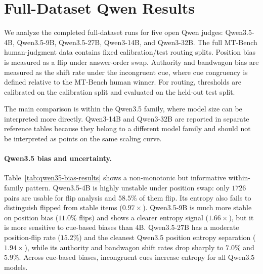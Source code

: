 \section{Full-Dataset Qwen Results}
\label{sec:full-qwen-results}

We analyze the completed full-dataset runs for five open Qwen judges:
Qwen3.5-4B, Qwen3.5-9B, Qwen3.5-27B, Qwen3-14B, and Qwen3-32B. The full
MT-Bench human-judgment data contains fixed calibration/test routing splits.
Position bias is measured as a flip under answer-order swap. Authority and
bandwagon bias are measured as the shift rate under the incongruent cue, where
cue congruency is defined relative to the MT-Bench human winner. For routing,
thresholds are calibrated on the calibration split and evaluated on the
held-out test split.

The main comparison is within the Qwen3.5 family, where model size can be
interpreted more directly. Qwen3-14B and Qwen3-32B are reported in separate
reference tables because they belong to a different model family and should not
be interpreted as points on the same scaling curve.

\paragraph{Qwen3.5 bias and uncertainty.}
Table~\ref{tab:qwen35-bias-results} shows a non-monotonic but informative
within-family pattern. Qwen3.5-4B is highly unstable under position swap:
only $1726$ pairs are usable for flip analysis and $58.5\%$ of them flip. Its
entropy also fails to distinguish flipped from stable items ($0.97\times$).
Qwen3.5-9B is much more stable on position bias ($11.0\%$ flips) and shows a
clearer entropy signal ($1.66\times$), but it is more sensitive to cue-based
biases than 4B. Qwen3.5-27B has a moderate position-flip rate ($15.2\%$) and
the cleanest Qwen3.5 position entropy separation ($1.94\times$), while its
authority and bandwagon shift rates drop sharply to $7.0\%$ and $5.9\%$.
Across cue-based biases, incongruent cues increase entropy for all Qwen3.5
models.

